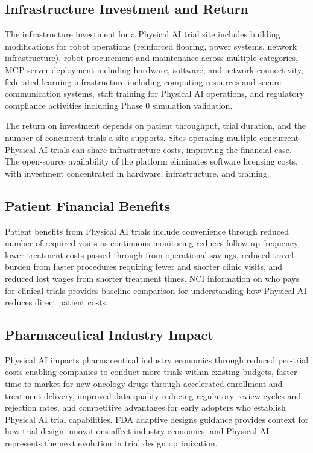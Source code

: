 \subsection{Infrastructure Investment and Return}
\label{subsec:financial-infrastructure}

The infrastructure investment for a Physical AI trial site includes building
modifications for robot operations (reinforced flooring, power systems, network
infrastructure), robot procurement and maintenance across multiple categories,
MCP server deployment \cite{national-mcp-paper} including hardware, software,
and network connectivity, federated learning infrastructure \cite{fl-paper}
including computing resources and secure communication systems, staff training
for Physical AI operations, and regulatory compliance activities including
Phase 0 simulation validation.

The return on investment depends on patient throughput, trial duration, and the
number of concurrent trials a site supports. Sites operating multiple concurrent
Physical AI trials can share infrastructure costs, improving the financial case.
The open-source availability of the platform \cite{main-repo, mcp-repo, fl-repo}
eliminates software licensing costs, with investment concentrated in hardware,
infrastructure, and training.

\subsection{Patient Financial Benefits}
\label{subsec:financial-patient}

Patient benefits from Physical AI trials include convenience through reduced
number of required visits as continuous monitoring reduces follow-up frequency,
lower treatment costs passed through from operational savings, reduced travel
burden from faster procedures requiring fewer and shorter clinic visits, and
reduced lost wages from shorter treatment times. NCI information on who pays
for clinical trials \cite{nci-trials-paying} provides baseline comparison for
understanding how Physical AI reduces direct patient costs.

\subsection{Pharmaceutical Industry Impact}
\label{subsec:financial-pharma}

Physical AI impacts pharmaceutical industry economics through reduced per-trial
costs enabling companies to conduct more trials within existing budgets, faster
time to market for new oncology drugs through accelerated enrollment and
treatment delivery, improved data quality reducing regulatory review cycles and
rejection rates, and competitive advantages for early adopters who establish
Physical AI trial capabilities. FDA adaptive designs guidance
\cite{fda-adaptive-designs} provides context for how trial design innovations
affect industry economics, and Physical AI represents the next evolution in
trial design optimization.

